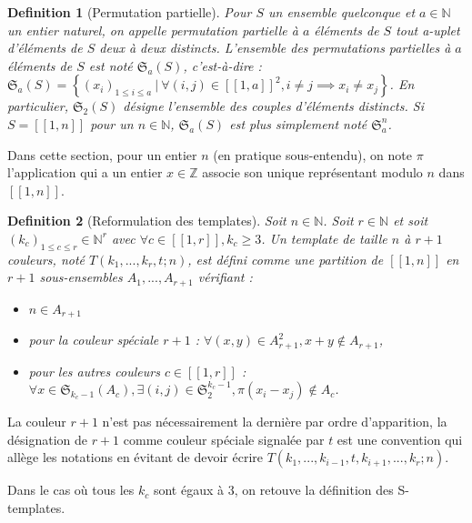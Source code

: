 \documentclass{article}
\newtheorem{definition}{Definition}[section]
\begin{document}
\begin{definition}[Permutation partielle]
Pour \(S\) un ensemble quelconque et \(a \in \mathbb{N}\) un entier naturel, on appelle permutation partielle à \(a\) éléments de \(S\) tout a-uplet d'éléments de \(S\) deux à deux distincts. L'ensemble des permutations partielles à \(a\) éléments de \(S\) est noté \(\mathfrak{S}_a(S)\), c'est-à-dire : \(\mathfrak{S}_a(S) = \left\{ (x_i)_{1 \leqslant i \leqslant a} ~|~ \forall (i, j) \in [\![1, a]\!]^2, i \neq j \implies x_i \neq x_j \right\}\). En particulier, \(\mathfrak{S}_2(S)\) désigne l'ensemble des couples d'éléments distincts. Si \(S = [\![1, n]\!]\) pour un \(n \in \mathbb{N}\), \(\mathfrak{S}_a(S)\) est plus simplement noté \(\mathfrak{S}_a^n\).
\end{definition}

Dans cette section, pour un entier \(n\) (en pratique sous-entendu), on note \(\pi\) l'application qui a un entier \(x \in \mathbb{Z}\) associe son unique représentant modulo \(n\) dans \([\![1, n]\!]\).

\begin{definition}[Reformulation des templates]
Soit \(n \in \mathbb{N}\). Soit \(r \in \mathbb{N}\) et soit \((k_c)_{1 \leqslant c \leqslant r} \in \mathbb{N}^r\) avec \(\forall c \in [\![1,r]\!], k_c \geqslant 3\). Un template de taille \(n\) à \(r + 1\) couleurs, noté \(T(k_1, ..., k_r, t; n)\), est défini comme une partition de \([\![1, n]\!]\) en \(r+1\) sous-ensembles \(A_1, ..., A_{r+1}\) vérifiant : 
\begin{itemize}
\item \(n \in A_{r+1}\)
\item pour la couleur spéciale \(r + 1\) : \(\forall (x,y) \in A_{r+1}^2, x + y \notin A_{r+1}\),
\item pour les autres couleurs \(c \in [\![1, r]\!]\) : \(\forall x \in \mathfrak{S}_{k_c - 1}(A_c), \exists (i, j) \in \mathfrak{S}_2^{k_c - 1}, \pi(x_i - x_j) \notin A_c\).
\end{itemize}
\end{definition}

La couleur \(r + 1\)  n'est pas nécessairement la dernière par ordre d'apparition, la désignation de \(r+1\) comme couleur spéciale signalée par \(t\) est une convention qui allège les notations en évitant de devoir écrire \(T(k_1, ..., k_{i - 1}, t,  k_{i + 1}, ..., k_r; n)\).

Dans le cas où tous les \(k_c\) sont égaux à 3, on retouve la définition des S-templates.
\end{document}
